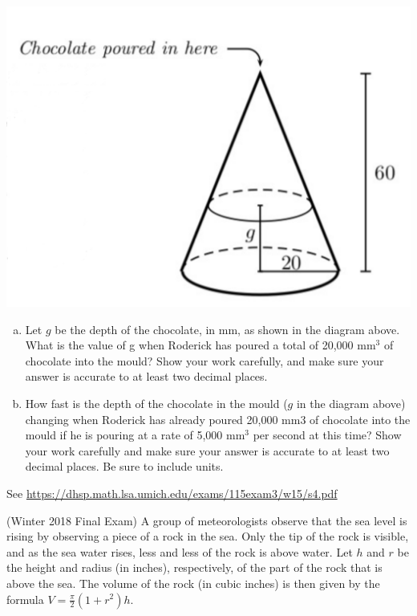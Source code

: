 \documentclass[11pt]{exam}
\begin{document}
\begin{questions}
\vspace{-1em}
\begin{center}
  \includegraphics[scale=0.4]{Figures/chocolate}
\end{center}
\vspace{-1em}
\begin{enumerate}[(a)]
\item Let $g$ be the depth of the chocolate, in mm, as shown in the diagram above. What is the value of g when Roderick has poured a total of 20,000 mm$^3$ of chocolate into the mould? Show your work carefully, and make sure your answer is accurate to at least two decimal places.
\item How fast is the depth of the chocolate in the mould ($g$ in the diagram above) changing when Roderick has already poured 20,000 mm3 of chocolate into the mould if he is pouring at a rate of 5,000 mm$^3$ per second at this time? Show your work carefully and make sure your answer is accurate to at least two decimal places. Be sure to include units.
\end{enumerate}
\begin{solution}
  See \href{https://dhsp.math.lsa.umich.edu/exams/115exam3/w15/s4.pdf}{https://dhsp.math.lsa.umich.edu/exams/115exam3/w15/s4.pdf}
\end{solution}
\question (Winter 2018 Final Exam) %
A group of meteorologists observe that the sea level is rising by observing a piece of a rock in the sea. Only the tip of the rock is visible, and as the sea water rises, less and less of the rock is above water. Let $h$ and $r$ be the height and radius (in inches), respectively, of the part of the rock that is above the sea. The volume of the rock (in cubic inches) is then given by the formula $V = \frac{\pi}{2} (1+r^2)h$.

\end{questions}
\end{document}
